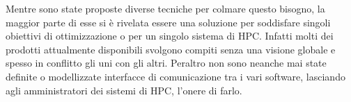 Mentre sono state proposte diverse tecniche per colmare questo bisogno, %
la maggior parte di esse si è rivelata essere una soluzione per soddisfare singoli obiettivi di ottimizzazione o per un singolo sistema di HPC. Infatti molti dei prodotti attualmente disponibili svolgono compiti senza una visione globale e spesso in conflitto gli uni con gli altri. Peraltro non sono neanche mai state definite o modellizzate interfacce di comunicazione tra i vari software, lasciando agli amministratori dei sistemi di HPC, l'onere di farlo.




